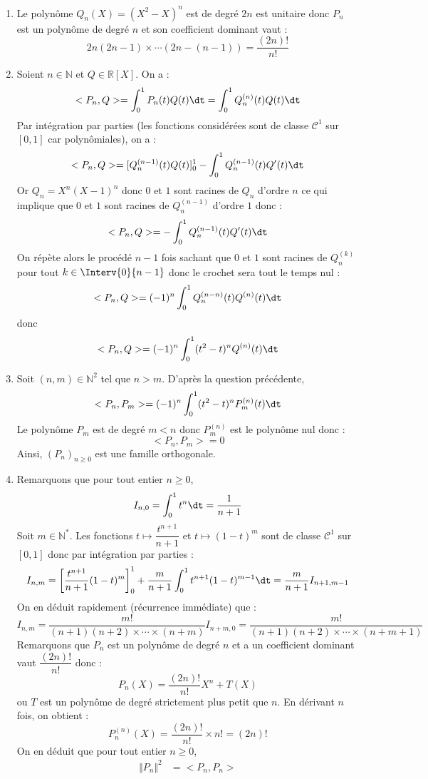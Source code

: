 \documentclass[a4paper,10pt]{report}
\begin{document}
\begin{enumerate}
\item Le polynôme $Q_n(X)=(X^2-X)^n$ est de degré $2n$ est unitaire donc $P_n$ est un polynôme de degré $n$ et son coefficient dominant vaut :
$$ 2n(2n-1) \times \cdots (2n-(n-1)) =\dfrac{(2n)!}{n!}$$
\item Soient $n \in \mathbb{N}$ et $Q \in \mathbb{R}[X]$. On a :
$$ <P_n,Q> = \int_0^1 P_n(t) Q(t) \dt = \int_0^1 Q_n^{(n)}(t) Q(t) \dt$$
Par intégration par parties (les fonctions considérées sont de classe $\mathcal{C}^1$ sur $[0,1]$ car polynômiales), on a :
$$ <P_n,Q> = [Q_n^{(n-1)}(t) Q(t)]_0^1 - \int_0^1 Q_n^{(n-1)}(t) Q'(t) \dt$$
Or $Q_n=X^n(X-1)^n$ donc $0$ et $1$ sont racines de $Q_n$ d'ordre $n$ ce qui implique que $0$ et $1$ sont racines de $Q_n^{(n-1)}$ d'ordre $1$ donc :
$$ <P_n,Q> =  - \int_0^1 Q_n^{(n-1)}(t) Q'(t) \dt$$
On répète alors le procédé $n-1$ fois sachant que $0$ et $1$ sont racines de $Q_n^{(k)}$ pour tout $k \in \Interv{0}{n-1}$ donc le \og crochet \fg{} sera tout le temps nul :
$$ <P_n,Q> = (-1)^n \int_0^1 Q_n^{(n-n)}(t) Q^{(n)}(t) \dt$$
donc
$$ <P_n,Q> = (-1)^n \int_{0}^1 (t^2-t)^n Q^{(n)}(t) \dt $$
\item Soit $(n,m) \in \mathbb{N}^2$ tel que $n>m$. D'après la question précédente,
$$ <P_n,P_m> = (-1)^n \int_{0}^1 (t^2-t)^n P_m^{(n)}(t) \dt$$
Le polynôme $P_m$ est de degré $m<n$ donc $P_m^{(n)}$ est le polynôme nul donc :
$$ <P_n,P_m>  = 0$$
Ainsi, $(P_n)_{n \geq 0}$ est une famille orthogonale.
\item Remarquons que pour tout entier $n \geq 0$,
$$ I_{n,0} = \int_0^1 t^n \dt = \dfrac{1}{n+1}$$
Soit $m \in \mathbb{N}^*$. Les fonctions $t \mapsto \dfrac{t^{n+1}}{n+1}$ et $t \mapsto (1-t)^m$ sont de classe $\mathcal{C}^1$ sur $[0,1]$ donc par intégration par parties :
$$ I_{n,m} = \left[ \dfrac{t^{n+1}}{n+1}(1-t)^{m} \right]_0^1 + \dfrac{m}{n+1} \int_0^1 t^{n+1}(1-t)^{m-1} \dt =  \dfrac{m}{n+1} I_{n+1,m-1}$$
On en déduit rapidement (récurrence immédiate) que : 
$$ I_{n,m} = \dfrac{m!}{(n+1)(n+2) \times \cdots \times (n+m)} I_{n+m,0} =   \dfrac{m!}{(n+1)(n+2) \times \cdots \times (n+m+1)}$$
Remarquons que $P_n$ est un polynôme de degré $n$ et a un coefficient dominant vaut $\dfrac{(2n)!}{n!}$ donc :
$$ P_n(X) = \dfrac{(2n)!}{n!} X^n + T(X)$$
ou $T$ est un polynôme de degré strictement plus petit que $n$. En dérivant $n$ fois, on obtient :
$$ P_n^{(n)}(X) = \dfrac{(2n)!}{n!} \times n! = (2n)!$$
On en déduit que pour tout entier $n \geq 0$,
\begin{align*}
\Vert P_n \Vert^2 & = <P_n,P_n> \\

\end{align*}
\end{enumerate}
\end{document}
